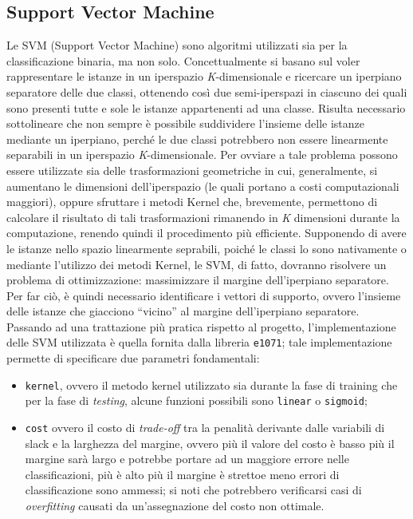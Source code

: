 \subsection{Support Vector Machine}
Le SVM (Support Vector Machine) sono algoritmi utilizzati sia per la classificazione binaria, ma non solo. 
Concettualmente si basano sul voler rappresentare le istanze in un iperspazio \textit{K}-dimensionale e ricercare un iperpiano separatore delle due classi, ottenendo così due semi-iperspazi in ciascuno dei quali sono presenti tutte e sole le istanze appartenenti ad una classe.
Risulta necessario sottolineare che non sempre è possibile suddividere l'insieme delle istanze mediante un iperpiano, perché le due classi potrebbero non essere linearmente separabili in un iperspazio \textit{K}-dimensionale.
Per ovviare a tale problema possono essere utilizzate sia delle trasformazioni geometriche in cui, generalmente, si aumentano le dimensioni dell'iperspazio (le quali portano a costi computazionali maggiori), oppure sfruttare i metodi Kernel che, brevemente, permettono di calcolare il risultato di tali trasformazioni rimanendo in \textit{K} dimensioni durante la computazione, renendo quindi il procedimento più efficiente.
Supponendo di avere le istanze nello spazio linearmente seprabili, poiché le classi lo sono nativamente o mediante l'utilizzo dei metodi Kernel, le SVM, di fatto, dovranno risolvere un problema di ottimizzazione: massimizzare il margine dell'iperpiano separatore.
Per far ciò, è quindi necessario identificare i vettori di supporto, ovvero l'insieme delle istanze che giacciono “vicino” al margine dell'iperpiano separatore.\\
Passando ad una trattazione più pratica rispetto al progetto, l'implementazione delle SVM utilizzata è quella fornita dalla libreria \texttt{e1071}; tale implementazione permette di specificare due parametri fondamentali:\begin{itemize}
	\item \texttt{kernel}, ovvero il metodo kernel utilizzato sia durante la fase di training che per la fase di \textit{testing}, alcune funzioni possibili sono \texttt{linear} o \texttt{sigmoid};
	\item \texttt{cost} ovvero il costo di \textit{trade-off} tra la penalità derivante dalle variabili di slack e la larghezza del margine, ovvero più il valore del costo è basso più il margine sarà largo e potrebbe portare ad un maggiore errore nelle classificazioni, più è alto più il margine è strettoe meno errori di classificazione sono ammessi; si noti che potrebbero verificarsi casi di \textit{overfitting} causati da un'assegnazione del costo non ottimale. 
\end{itemize}
